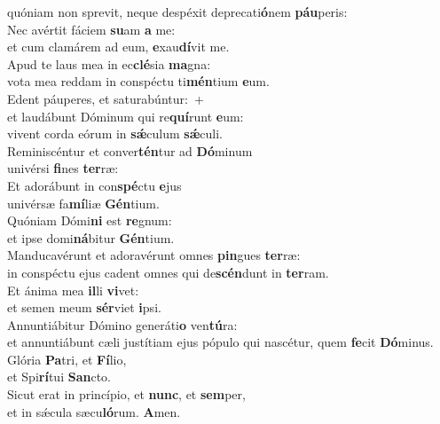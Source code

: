\oddverse quóniam non sprevit, neque despéxit deprecati\textbf{ó}nem \textbf{páu}peris:\\
\evenverse Nec avértit fáciem \textbf{su}am \textbf{a} me:~\*\\
\evenverse et cum clamárem ad eum, \textbf{e}xau\textbf{dí}vit me.\\
\oddverse Apud te laus mea in ec\textbf{clé}sia \textbf{ma}gna:~\*\\
\oddverse vota mea reddam in conspéctu ti\textbf{mén}tium \textbf{e}um.\\
\evenverse Edent páuperes, et saturabúntur:~+\\
\evenverse  et laudábunt Dóminum qui re\textbf{quí}runt \textbf{e}um:~\*\\
\evenverse vivent corda eórum in \textbf{sǽ}culum \textbf{sǽ}culi.\\
\oddverse Reminiscéntur et conver\textbf{tén}tur ad \textbf{Dó}minum~\*\\
\oddverse univérsi \textbf{fi}nes \textbf{ter}ræ:\\
\evenverse Et adorábunt in con\textbf{spé}ctu \textbf{e}jus~\*\\
\evenverse univérsæ fa\textbf{mí}liæ \textbf{Gén}tium.\\
\oddverse Quóniam Dómi\textbf{ni} est \textbf{re}gnum:~\*\\
\oddverse et ipse domi\textbf{ná}bitur \textbf{Gén}tium.\\
\evenverse Manducavérunt et adoravérunt omnes \textbf{pin}gues \textbf{ter}ræ:~\*\\
\evenverse in conspéctu ejus cadent omnes qui de\textbf{scén}dunt in \textbf{ter}ram.\\
\oddverse Et ánima mea \textbf{il}li \textbf{vi}vet:~\*\\
\oddverse et semen meum \textbf{sér}viet \textbf{i}psi.\\
\evenverse Annuntiábitur Dómino generáti\textbf{o} ven\textbf{tú}ra:~\*\\
\evenverse et annuntiábunt cæli justítiam ejus pópulo qui nascétur, quem \textbf{fe}cit \textbf{Dó}minus.\\
\oddverse Glória \textbf{Pa}tri, et \textbf{Fí}lio,~\*\\
\oddverse et Spi\textbf{rí}tui \textbf{San}cto.\\
\evenverse Sicut erat in princípio, et \textbf{nunc}, et \textbf{sem}per,~\*\\
\evenverse et in sǽcula sæcu\textbf{ló}rum. \textbf{A}men.\\
